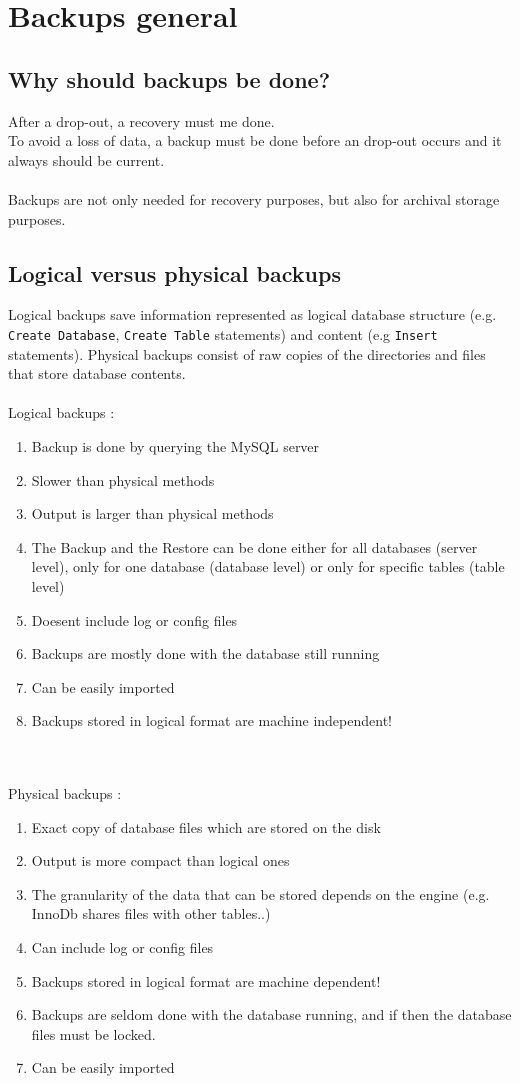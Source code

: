 \documentclass[10pt]{article}
\begin{document}
\section{Backups general}
\subsection{Why should backups be done?}
After a drop-out, a recovery must me done. \\
To avoid a loss of data, a backup must be done before an drop-out occurs and it always should be current. \\ \\
Backups are not only needed for recovery purposes, but also for archival storage purposes.
\subsection{Logical versus physical backups}
Logical backups save information represented as logical database structure (e.g. \texttt{Create Database}, \texttt{Create Table}  statements) and content (e.g \texttt{Insert} statements). Physical backups consist of raw copies of the directories and files that store database contents. \\ \\
Logical backups :
\begin{enumerate}
\item Backup is done by querying the MySQL server
\item Slower than physical methods
\item Output is larger than physical methods
\item The Backup and the Restore can be done either for all databases (server level), only for one database (database level) or only for specific tables (table level)
\item Doesent include log or config files
\item Backups are mostly done with the database still running
\item Can be easily imported
\item Backups stored in logical format are machine independent!
\end{enumerate}\cite{mysqlbackupandrectypesman}
\\ \\Physical backups :
\begin{enumerate}
\item Exact copy of database files which are stored on the disk
\item Output is more compact than logical ones
\item The granularity of the data that can be stored depends on the engine (e.g. InnoDb shares files with other tables..) 
\item Can include log or config files
\item Backups stored in logical format are machine dependent!
\item Backups are seldom done with the database running, and if then the database files must be locked.
\item Can be easily imported
\end{enumerate} \cite{mysqlbackupandrectypesman}
\end{document}
